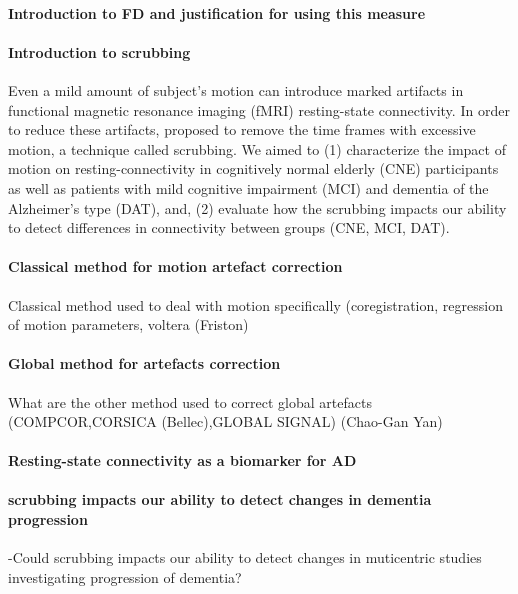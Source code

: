 \documentclass[authoryear,preprint,review]{elsarticle}
\begin{document}
\paragraph{Introduction to FD and justification for using this measure} 

\paragraph{Introduction to scrubbing} 
Even a mild amount of subject's motion can introduce marked artifacts in functional magnetic resonance imaging (fMRI) resting-state connectivity. In order to reduce these artifacts, \cite{power2012} proposed to remove the time frames with excessive motion, a technique called scrubbing. We aimed to (1) characterize the impact of motion on resting-connectivity in cognitively normal elderly (CNE) participants as well as patients with mild cognitive impairment (MCI) and dementia of the Alzheimer's type (DAT), and, (2) evaluate how the scrubbing impacts our ability to detect differences in connectivity between groups (CNE, MCI, DAT).

\paragraph{Classical method for motion artefact correction}
Classical method used to deal with motion specifically (coregistration, regression of motion parameters, voltera (Friston) 

\paragraph{Global method for artefacts correction} 
What are the other method used to correct global artefacts (COMPCOR,CORSICA (Bellec),GLOBAL SIGNAL) (Chao-Gan Yan)

\paragraph{Resting-state connectivity as a biomarker for AD} 

\paragraph{scrubbing impacts our ability to detect changes in dementia progression} 
-Could scrubbing impacts our ability to detect changes in muticentric studies investigating progression of dementia?
\end{document}
